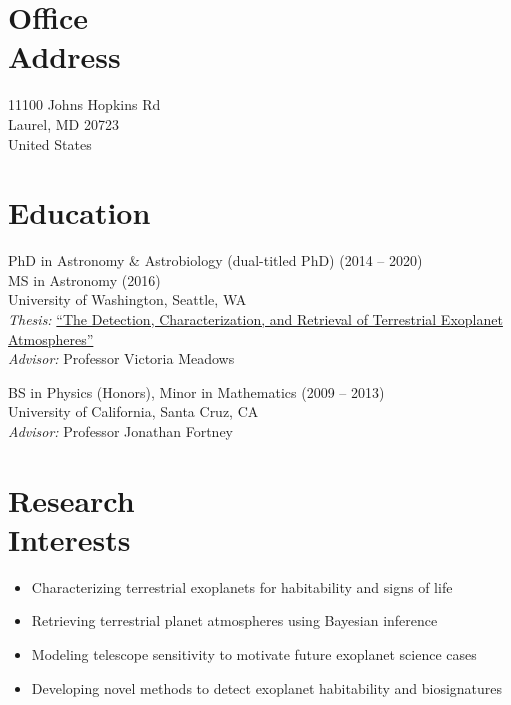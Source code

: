 \documentclass[margin,10pt]{res}
\begin{document}
\begin{resume}


\section{Office \\Address}
11100 Johns Hopkins Rd \\
Laurel, MD 20723 \\
United States \\

\section{Education} 
PhD in Astronomy \& Astrobiology (dual-titled PhD) \hfill (2014 -- 2020) \\
MS in Astronomy (2016) \\
University of Washington, Seattle, WA  \\
\textit{Thesis:} \href{https://digital.lib.washington.edu/researchworks/handle/1773/46370}{``The Detection, Characterization, and Retrieval of Terrestrial Exoplanet Atmospheres''} \\
\textit{Advisor:} Professor Victoria Meadows 

BS in Physics (Honors), Minor in Mathematics \hfill (2009 -- 2013) \\
University of California, Santa Cruz, CA \\
\textit{Advisor:} Professor Jonathan Fortney \\

\section{Research \\Interests}
                \begin{itemize}  \itemsep -1pt %
                        \item Characterizing terrestrial exoplanets for habitability and signs of life 
                        \item Retrieving terrestrial planet atmospheres using Bayesian inference 
                        \item Modeling telescope sensitivity to motivate future exoplanet science cases 
                        \item Developing novel methods to detect exoplanet habitability and biosignatures \\
                    \end{itemize}


\end{resume}
\end{document}
